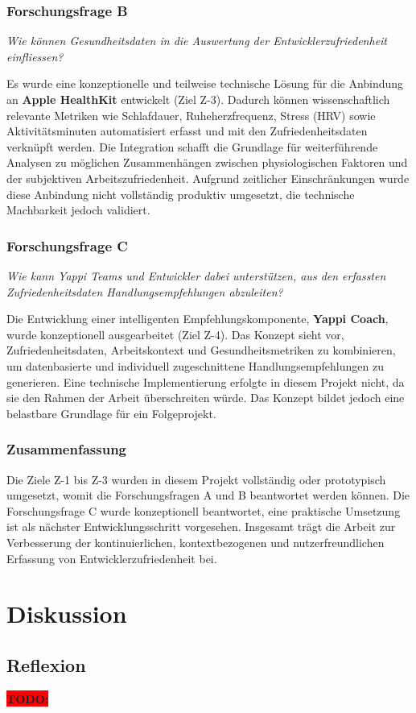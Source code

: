 \documentclass[12pt,a4paper]{report}
\newcommand{\todo}[1]{\colorbox{red}{\textbf{TODO: #1}}\\}
\begin{document}
    \subsection*{Forschungsfrage B}
    \textit{Wie können Gesundheitsdaten in die Auswertung der Entwicklerzufriedenheit einfliessen?}

    Es wurde eine konzeptionelle und teilweise technische Lösung für die Anbindung an \textbf{Apple HealthKit} entwickelt
    (Ziel Z-3). Dadurch können wissenschaftlich relevante Metriken wie Schlafdauer, Ruheherzfrequenz, Stress (HRV) sowie
    Aktivitätsminuten automatisiert erfasst und mit den Zufriedenheitsdaten verknüpft werden.
    Die Integration schafft die Grundlage für weiterführende Analysen zu möglichen Zusammenhängen zwischen physiologischen
    Faktoren und der subjektiven Arbeitszufriedenheit. Aufgrund zeitlicher Einschränkungen wurde diese Anbindung nicht
    vollständig produktiv umgesetzt, die technische Machbarkeit jedoch validiert.

    \subsection*{Forschungsfrage C}
    \textit{Wie kann Yappi Teams und Entwickler dabei unterstützen, aus den erfassten Zufriedenheitsdaten
    Handlungsempfehlungen abzuleiten?}

    Die Entwicklung einer intelligenten Empfehlungskomponente, \textbf{Yappi Coach}, wurde konzeptionell ausgearbeitet
    (Ziel Z-4).
    Das Konzept sieht vor, Zufriedenheitsdaten, Arbeitskontext und Gesundheitsmetriken zu kombinieren, um datenbasierte
    und individuell zugeschnittene Handlungsempfehlungen zu generieren. Eine technische Implementierung erfolgte in diesem
    Projekt nicht, da sie den Rahmen der Arbeit überschreiten würde. Das Konzept bildet jedoch eine belastbare Grundlage
    für ein Folgeprojekt.

    \subsection*{Zusammenfassung}
    Die Ziele Z-1 bis Z-3 wurden in diesem Projekt vollständig oder prototypisch umgesetzt, womit die Forschungsfragen
    A und B beantwortet werden können. Die Forschungsfrage C wurde konzeptionell beantwortet, eine praktische Umsetzung
    ist als nächster Entwicklungsschritt vorgesehen. Insgesamt trägt die Arbeit zur Verbesserung der kontinuierlichen,
    kontextbezogenen und nutzerfreundlichen Erfassung von Entwicklerzufriedenheit bei.



\chapter{Diskussion}
\section{Reflexion}
\todo{}

\printbibliography
\end{document}

